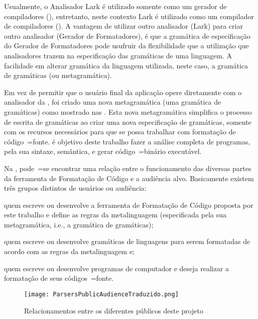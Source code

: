 Usualmente,
o Analisador Lark é utilizado somente como um gerador de compiladores (),
entretanto,
neste contexto Lark é utilizado como um compilador de compiladores ().
A vantagem de utilizar outro analisador (Lark) para criar outro analisador (Gerador de Formatadores),
é que a gramática de especificação do Gerador de Formatadores pode usufruir da flexibilidade que a utilização que analisadores trazem na especificação das gramáticas de uma linguagem.
A facilidade em alterar gramática da linguagem utilizada,
neste caso,
a gramática de gramáticas (ou metagramática).

Em vez de permitir que o usuário final da aplicação opere diretamente com o analisador da ,
foi criado uma nova metagramática (uma gramática de gramáticas) como mostrado nas .
Esta nova metagramática simplifica o processo de escrita de gramáticas ao criar uma nova especificação de gramáticas,
somente com os recursos necessários para que se possa trabalhar com formatação de código~=fonte.
 é objetivo deste trabalho fazer a análise completa de programas,
pela sua sintaxe, semântica,
e gerar código~=binário executável.

Na ,
pode~=se encontrar uma relação entre o funcionamento das diversas partes da ferramenta de Formatação de Código e
a audiência alvo.
Basicamente existem três grupos distintos de usuários ou
audiência:
\begin{inparaenum}[1)]
\item quem escreve ou
desenvolve a ferramenta de Formatação de Código proposta por este trabalho e
define as regras da metalinguagem (especificada pela sua metagramática,
i.e.,
a gramática de gramáticas);
\item quem escreve ou
desenvolve gramáticas de linguagens para serem formatadas de acordo com as regras da metalinguagem e;
\item quem escreve ou
desenvolve programas de computador e
deseja realizar a formatação de seus códigos~=fonte.
\end{inparaenum}%
\begin{figure}[!htb]
\caption{Relacionamentos entre os diferentes públicos deste projeto}
\label{ParsersPublicAudienceTraduzido}
\centering
\texttt{[image: ParsersPublicAudienceTraduzido.png]}
\end{figure}

